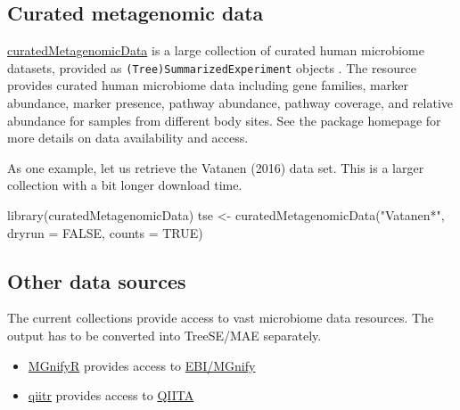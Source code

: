 \documentclass[
]{book}
\newenvironment{Shaded}{\begin{snugshade}}{\end{snugshade}}
\newcommand{\AttributeTok}[1]{\textcolor[rgb]{0.77,0.63,0.00}{#1}}
\newcommand{\ConstantTok}[1]{\textcolor[rgb]{0.00,0.00,0.00}{#1}}
\newcommand{\FunctionTok}[1]{\textcolor[rgb]{0.00,0.00,0.00}{#1}}
\newcommand{\NormalTok}[1]{#1}
\newcommand{\OtherTok}[1]{\textcolor[rgb]{0.56,0.35,0.01}{#1}}
\newcommand{\StringTok}[1]{\textcolor[rgb]{0.31,0.60,0.02}{#1}}
\providecommand{\tightlist}{%
  \setlength{\itemsep}{0pt}\setlength{\parskip}{0pt}}
\begin{document}
\hypertarget{curated-metagenomic-data}{%
\subsection{Curated metagenomic data}\label{curated-metagenomic-data}}

\href{https://bioconductor.org/packages/release/data/experiment/html/curatedMetagenomicData.html}{curatedMetagenomicData}
is a large collection of curated human microbiome datasets, provided as
\texttt{(Tree)SummarizedExperiment} objects \citep{Pasolli2017}. The resource
provides curated human microbiome data including gene families, marker
abundance, marker presence, pathway abundance, pathway coverage, and
relative abundance for samples from different body sites. See the
package homepage for more details on data availability and access.

As one example, let us retrieve the Vatanen (2016) \citep{Vatanen2016} data
set. This is a larger collection with a bit longer download time.

\begin{Shaded}
\begin{Highlighting}[]
\FunctionTok{library}\NormalTok{(curatedMetagenomicData)}
\NormalTok{tse }\OtherTok{\textless{}{-}} \FunctionTok{curatedMetagenomicData}\NormalTok{(}\StringTok{"Vatanen*"}\NormalTok{, }\AttributeTok{dryrun =} \ConstantTok{FALSE}\NormalTok{, }\AttributeTok{counts =} \ConstantTok{TRUE}\NormalTok{)}
\end{Highlighting}
\end{Shaded}

\hypertarget{other-data-sources}{%
\subsection{Other data sources}\label{other-data-sources}}

The current collections provide access to vast microbiome data
resources. The output has to be converted into TreeSE/MAE separately.

\begin{itemize}
\tightlist
\item
  \href{https://github.com/beadyallen/MGnifyR}{MGnifyR} provides access to \href{https://www.ebi.ac.uk/metagenomics/}{EBI/MGnify}
\item
  \href{https://github.com/cran/qiitr}{qiitr} provides access to \href{https://qiita.com/about}{QIITA}
\end{itemize}
\end{document}
